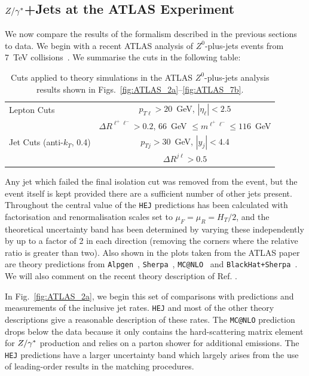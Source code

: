 	\subsection{$Z/\gamma^*$+Jets at the ATLAS Experiment}
		\label{sub:ATLASZsec}

		We now compare the results of the formalism described in the previous sections
		to data.  We begin with a recent ATLAS analysis of $Z^0$-plus-jets events from
		7~TeV collisions~\cite{Aad:2013ysa}.  We summarise the cuts in the following
		table:

		\begin{table}[bth]
		  \centering
		  \begin{tabular}{|l|c|}
		    \hline
		    Lepton Cuts & $p_{T\ell}>20$~GeV, \; $|\eta_\ell|<2.5$ \\
		    & $\Delta R^{\ell^+\ell^-} > 0.2$, \; $66$~GeV $\leq m^{\ell^+\ell^-} \leq
		      116$~GeV \\ \hline
		    Jet Cuts (anti-$k_T$, 0.4) & $p_{Tj}>30$~GeV, \; $|y_j|<4.4$ \\
		    & $\Delta R^{j\ell} >0.5$ \\
		\hline
		  \end{tabular}
		  \caption{Cuts applied to theory simulations in the ATLAS
		    $Z^0$-plus-jets analysis results shown in Figs.~\eqref{fig:ATLAS_2a}--\eqref{fig:ATLAS_7b}.}
		  \label{tab:atlascuts}
		\end{table}

		Any jet which failed the final isolation cut was removed from the event, but the
		event itself is kept provided there are a sufficient number of other jets
		present.  Throughout the central value of the \texttt{HEJ} predictions has been
		calculated with factorisation and renormalisation scales set to
		$\mu_F=\mu_R=H_T/2$, and the theoretical uncertainty band has been determined by
		varying these independently by up to a factor of 2 in each direction (removing
		the corners where the relative ratio is greater than two).  Also shown in the
		plots taken from the ATLAS paper are theory predictions from
		\texttt{Alpgen}~\cite{Mangano:2002ea}, \texttt{Sherpa}~\cite{Gleisberg:2008ta,Hoeche:2012yf},
		\texttt{MC@NLO}~\cite{Frixione:2002ik} and
		\texttt{BlackHat+Sherpa}~\cite{Berger:2010vm,Ita:2011wn}.  We will also comment on the
		recent theory description of Ref.\cite{Frederix:2015eii} .

		In Fig.~\eqref{fig:ATLAS_2a}, we begin this set of comparisons with predictions
		and measurements of the inclusive jet rates.  \texttt{HEJ} and most of the other theory
		descriptions give a reasonable description of these rates.  The \texttt{MC@NLO}
		prediction drops below the data because it only contains the hard-scattering
		matrix element for $Z/\gamma^*$ production and relies on a parton shower for additional
		emissions. The \texttt{HEJ} predictions have a larger uncertainty band which largely
		arises from the use of leading-order results in the matching procedures.


